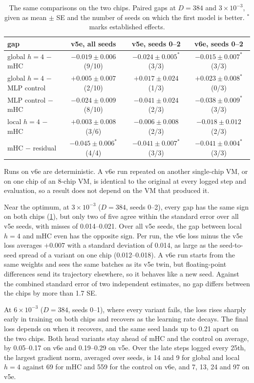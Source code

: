 \documentclass[11pt, a4paper]{article}
\newcommand{\lr}[1]{\ensuremath{#1 \times 10^{-3}}}
\newcommand{\est}{^{\ast}}
\begin{document}
\begin{table}[ht]
  \centering
  \caption{The same comparisons on the two chips. Paired gaps at $D = 384$ and \lr{3}, given as mean $\pm$ SE and the number of
    seeds on which the first model is better. $\est$ marks established effects.}
  \label{tab:chips}
  \small
  \begin{tabular}{lccc}
    \toprule
    gap & v5e, all seeds & v5e, seeds 0--2 & v6e, seeds 0--2 \\
    \midrule
    global $h = 4$ $-$ mHC & $-0.019 \pm 0.006$ (9/10) & $-0.024 \pm 0.005\est$ (3/3) & $-0.015 \pm 0.007\est$ (3/3) \\
    global $h = 4$ $-$ MLP control & $+0.005 \pm 0.007$ (2/10) & $+0.017 \pm 0.024$ (1/3) & $+0.023 \pm 0.008\est$ (0/3) \\
    MLP control $-$ mHC & $-0.024 \pm 0.009$ (8/10) & $-0.041 \pm 0.024$ (2/3) & $-0.038 \pm 0.009\est$ (3/3) \\
    local $h = 4$ $-$ mHC & $+0.003 \pm 0.008$ (3/6) & $-0.006 \pm 0.008$ (2/3) & $-0.018 \pm 0.012$ (2/3) \\
    mHC $-$ residual & $-0.045 \pm 0.006\est$ (4/4) & $-0.041 \pm 0.007\est$ (3/3) & $-0.041 \pm 0.004\est$ (3/3) \\
    \bottomrule
  \end{tabular}
\end{table}

Runs on v6e are deterministic. A v6e run repeated on another single-chip VM, or on one chip of an 8-chip VM, is identical to the
original at every logged step and evaluation, so a result does not depend on the VM that produced it.

Near the optimum, at \lr{3} ($D = 384$, seeds 0--2), every gap has the same sign on both chips (\cref{tab:chips}), but only two of
five agree within the standard error over all v5e seeds, with misses of 0.014--0.021. Over all v5e seeds, the gap between local
$h = 4$ and mHC even has the opposite sign. Per run, the v6e loss minus the v5e loss averages $+0.007$ with a standard deviation of
0.014, as large as the seed-to-seed spread of a variant on one chip (0.012--0.018). A v6e run starts from the same weights and sees
the same batches as its v5e twin, but floating-point differences send its trajectory elsewhere, so it behaves like a new seed.
Against the combined standard error of two independent estimates, no gap differs between the chips by more than 1.7 SE.

At \lr{6} ($D = 384$, seeds 0--1), where every variant fails, the loss rises sharply early in training on both chips and
recovers as the learning rate decays. The final loss depends on when it recovers, and the same seed lands up to 0.21 apart on the two chips. Both
head variants stay ahead of mHC and the control on average, by 0.05--0.17 on v6e and 0.19--0.29 on v5e. Over the late steps logged every 25th, the
largest gradient norm, averaged over seeds, is 14 and 9 for global and local $h = 4$ against 69 for
mHC and 559 for the control on v6e, and 7, 13, 24 and 97 on v5e.
\end{document}
